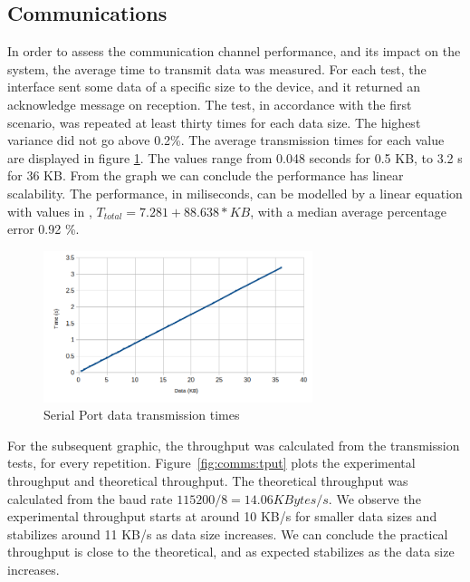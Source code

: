 \subsection{Communications}\label{chap:evaluation:performance:comms}

In order to assess the communication channel performance, and its impact on the system, the average time to transmit data was measured. For each test, the interface sent some data of a specific size to the device, and it returned an acknowledge message on reception. The test, in accordance with the first scenario, was repeated at least thirty times for each data size. The highest variance did not go above 0.2\%.
The average transmission times for each value are displayed in figure \ref{fig:comms:time}.
The values range from 0.048 seconds for 0.5 KB, to 3.2 s for 36 KB.
From the graph we can conclude the performance has linear scalability.
The performance, in miliseconds, can be modelled by a linear equation with values in , \(T_{total} = 7.281 + 88.638 * KB\), with a median average percentage error 0.92 \%.

\begin{figure}[h!]
	\centering
	\includegraphics[width=0.7\textwidth]{./Images/comms-time.png}
	\caption{Serial Port data transmission times}
	\label{fig:comms:time}
\end{figure}

For the subsequent graphic, the throughput was calculated from the transmission tests, for every repetition.
Figure~\ref{fig:comms:tput} plots the experimental throughput and theoretical throughput. The theoretical throughput was calculated from the baud rate \(115200/8 = 14.06 KBytes/s\).
We observe the experimental throughput starts at around 10 KB/s for smaller data sizes and stabilizes around 11 KB/s as data size increases.
We can conclude the practical throughput is close to the theoretical, and as expected stabilizes as the data size increases.

